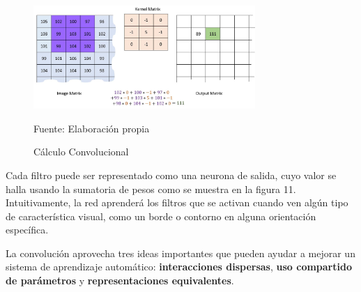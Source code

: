 		\begin{figure}[H]
		\begin{center}
		\includegraphics[width=0.75\textwidth]{images/marcoteorico/Convolution_calculation2}
		\end{center}
		\begin{center}
		\caption{\small{Cálculo Convolucional}}
		{\small{Fuente: Elaboración propia}}
		\end{center}
		\vspace{-1.9em}
		\end{figure}

		Cada filtro puede ser representado como una neurona de salida, cuyo valor se halla usando la sumatoria de pesos como se muestra en la figura 11. Intuitivamente, la red aprenderá los filtros que se activan cuando ven algún tipo de característica visual, como un borde o contorno en alguna orientación específica. 
		
		\vskip 0.4cm  
		
		La convolución aprovecha tres ideas importantes que pueden ayudar a mejorar un sistema de aprendizaje automático: {\bf interacciones dispersas}, {\bf uso compartido de parámetros} y {\bf representaciones equivalentes}.
		
